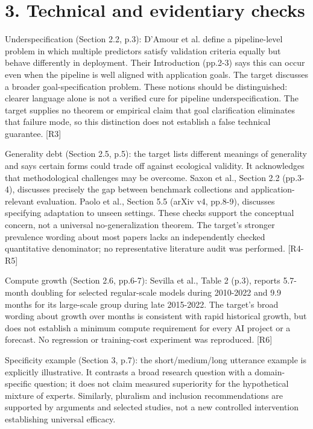 \documentclass[10pt]{article}
\begin{document}
\section*{3. Technical and evidentiary checks}
Underspecification (Section 2.2, p.3): D’Amour et al. define a pipeline-level problem in which multiple predictors satisfy validation criteria equally but behave differently in deployment. Their Introduction (pp.2-3) says this can occur even when the pipeline is well aligned with application goals. The target discusses a broader goal-specification problem. These notions should be distinguished: clearer language alone is not a verified cure for pipeline underspecification. The target supplies no theorem or empirical claim that goal clarification eliminates that failure mode, so this distinction does not establish a false technical guarantee. [R3]\par
Generality debt (Section 2.5, p.5): the target lists different meanings of generality and says certain forms could trade off against ecological validity. It acknowledges that methodological challenges may be overcome. Saxon et al., Section 2.2 (pp.3-4), discusses precisely the gap between benchmark collections and application-relevant evaluation. Paolo et al., Section 5.5 (arXiv v4, pp.8-9), discusses specifying adaptation to unseen settings. These checks support the conceptual concern, not a universal no-generalization theorem. The target’s stronger prevalence wording about most papers lacks an independently checked quantitative denominator; no representative literature audit was performed. [R4-R5]\par
Compute growth (Section 2.6, pp.6-7): Sevilla et al., Table 2 (p.3), reports 5.7-month doubling for selected regular-scale models during 2010-2022 and 9.9 months for its large-scale group during late 2015-2022. The target’s broad wording about growth over months is consistent with rapid historical growth, but does not establish a minimum compute requirement for every AI project or a forecast. No regression or training-cost experiment was reproduced. [R6]\par
Specificity example (Section 3, p.7): the short/medium/long utterance example is explicitly illustrative. It contrasts a broad research question with a domain-specific question; it does not claim measured superiority for the hypothetical mixture of experts. Similarly, pluralism and inclusion recommendations are supported by arguments and selected studies, not a new controlled intervention establishing universal efficacy.\par
\end{document}
